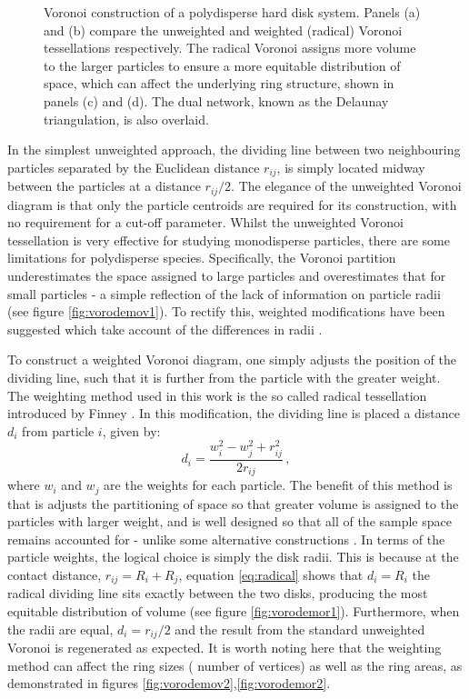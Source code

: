\begin{figure}[bt]
     \caption{Voronoi construction of a polydisperse hard disk system. Panels (a) and (b) compare the unweighted and weighted (radical) Voronoi tessellations respectively. The radical Voronoi assigns more volume to the larger particles to ensure a more equitable distribution of space, which can affect the underlying ring structure, shown in panels (c) and (d). The dual network, known as the Delaunay triangulation, is also overlaid.}
     \label{fig:vorodemo}
\end{figure}

In the simplest unweighted approach, the dividing line between two neighbouring particles separated by the Euclidean distance $r_{ij}$, is simply located midway between the particles at a distance $r_{ij} /2$. 
The elegance of the unweighted Voronoi diagram is that only the particle centroids are required for its construction, with no requirement for a cut-off parameter. 
Whilst the unweighted Voronoi tessellation is very effective for studying monodisperse particles, there are some limitations for polydisperse species. 
Specifically, the Voronoi partition underestimates the space assigned to large particles and overestimates that for small particles \-- a simple reflection of the lack of information on particle radii  (see figure \ref{fig:vorodemov1}). 
To rectify this, weighted modifications have been suggested which take account of the differences in radii \cite{Poupon2004}.

To construct a weighted Voronoi diagram, one simply adjusts the position of the dividing line, such that it is further from the particle with the greater weight. 
The weighting method used in this work is the so called radical tessellation introduced by Finney \cite{GELLATLY1982}. In this modification, the dividing line is placed a distance $d_i$ from particle $i$, given by:
\begin{equation}
	\label{eq:radical}
	d_i = \frac{w_i^2-w_j^2+r_{ij}^2}{2r_{ij}}\,,
\end{equation}
where $w_i$ and $w_j$ are the weights for each particle. 
The benefit of this method is that is adjusts the partitioning of space so that greater volume is assigned to the particles with larger weight, and is well designed so that all of the sample space remains accounted for - unlike some alternative constructions \cite{Richards1974}. 
In terms of the particle weights, the logical choice is simply the disk radii. 
This is because at the contact distance, $r_{ij} = R_i + R_j$, equation \eqref{eq:radical} shows that $d_i = R_i$ \ie{} the radical dividing line sits exactly between the two disks, producing the most equitable distribution of volume (see figure \ref{fig:vorodemor1}). 
Furthermore, when the radii are equal, $d_i = r_{ij} /2$ and the result from the standard unweighted Voronoi is regenerated as expected.
It is worth noting here that the weighting method can affect the ring sizes (\ie{} number of vertices) as well as the ring areas, as demonstrated in figures \ref{fig:vorodemov2},\ref{fig:vorodemor2}.

